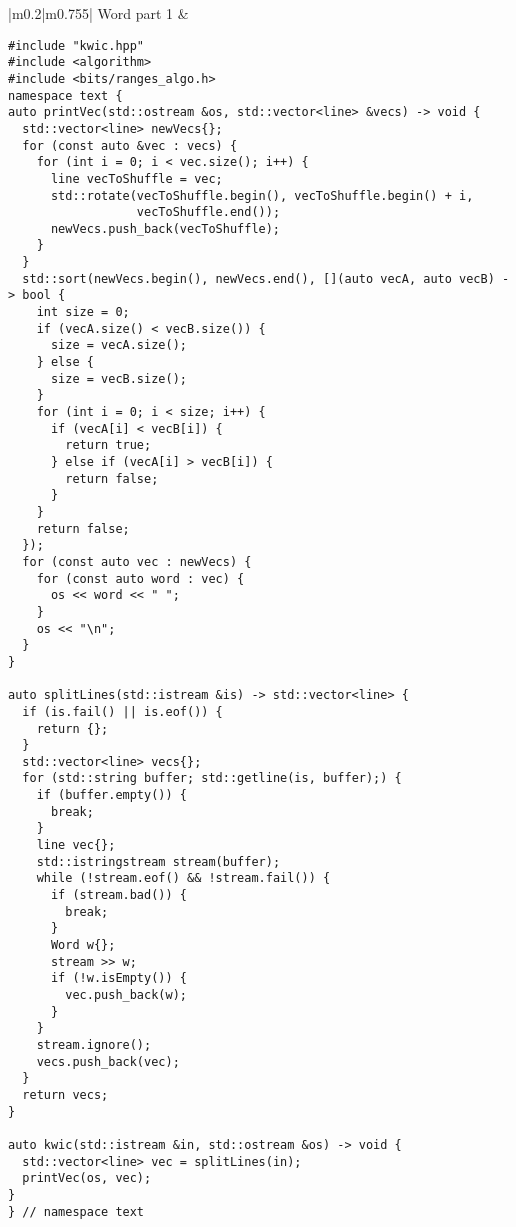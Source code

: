 \documentclass[main.tex,fontsize=8pt,paper=a4,paper=portrait,DIV=calc,]{scrartcl}
\begin{document}
\begin{table}[ht!]
\begin{tabular}{|m{0.2\linewidth}|m{0.755\linewidth}|}
\hline
Word part 1 & 
\vspace{2mm}
\begin{lstlisting}
#include "kwic.hpp"
#include <algorithm>
#include <bits/ranges_algo.h>
namespace text {
auto printVec(std::ostream &os, std::vector<line> &vecs) -> void {
  std::vector<line> newVecs{};
  for (const auto &vec : vecs) {
    for (int i = 0; i < vec.size(); i++) {
      line vecToShuffle = vec;
      std::rotate(vecToShuffle.begin(), vecToShuffle.begin() + i,
                  vecToShuffle.end());
      newVecs.push_back(vecToShuffle);
    }
  }
  std::sort(newVecs.begin(), newVecs.end(), [](auto vecA, auto vecB) -> bool {
    int size = 0;
    if (vecA.size() < vecB.size()) {
      size = vecA.size();
    } else {
      size = vecB.size();
    }
    for (int i = 0; i < size; i++) {
      if (vecA[i] < vecB[i]) {
        return true;
      } else if (vecA[i] > vecB[i]) {
        return false;
      }
    }
    return false;
  });
  for (const auto vec : newVecs) {
    for (const auto word : vec) {
      os << word << " ";
    }
    os << "\n";
  }
}

auto splitLines(std::istream &is) -> std::vector<line> {
  if (is.fail() || is.eof()) {
    return {};
  }
  std::vector<line> vecs{};
  for (std::string buffer; std::getline(is, buffer);) {
    if (buffer.empty()) {
      break;
    }
    line vec{};
    std::istringstream stream(buffer);
    while (!stream.eof() && !stream.fail()) {
      if (stream.bad()) {
        break;
      }
      Word w{};
      stream >> w;
      if (!w.isEmpty()) {
        vec.push_back(w);
      }
    }
    stream.ignore();
    vecs.push_back(vec);
  }
  return vecs;
}

auto kwic(std::istream &in, std::ostream &os) -> void {
  std::vector<line> vec = splitLines(in);
  printVec(os, vec);
}
} // namespace text
\end{lstlisting}
\\
\hline
\end{tabular}
\end{table}
\pagebreak
\end{document}
